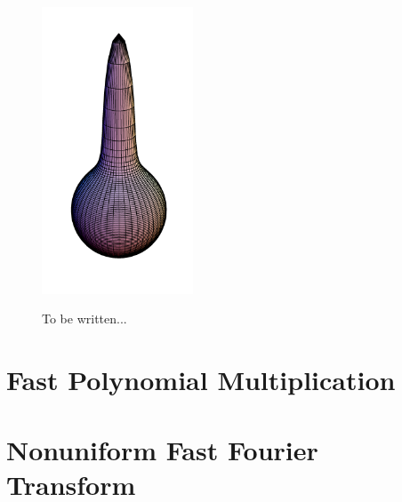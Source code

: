 \begin{figure}[tb]
     {\includegraphics[width=0.4\textwidth]{images/p_085.png}}
  \caption{To be written...}
\end{figure}

\label{Basics:SphericalKernels}

\section{Fast Polynomial Multiplication}
\label{Basics:FastPolynomialMultiplication}

\section{Nonuniform Fast Fourier Transform}
\label{Basics:NFFT}
